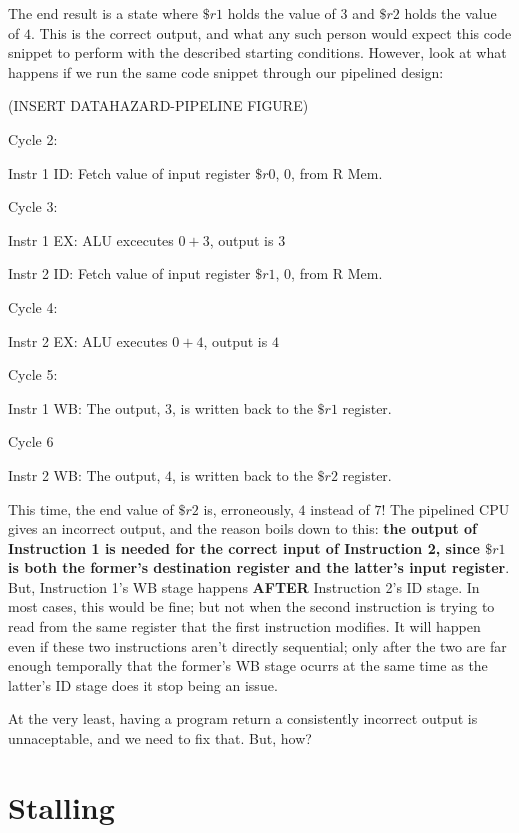 \documentclass[12pt,twoside]{reedthesis}
\begin{document}
\vspace{5mm}

The end result is a state where $\$r1$ holds the value of $3$ and $\$r2$ holds the value of $4$. This is the correct output, and what any such person would expect this code snippet to perform with the described starting conditions. However, look at what happens if we run the same code snippet through our pipelined design:

(INSERT DATAHAZARD-PIPELINE FIGURE)

Cycle 2:

\qquad Instr 1 ID:  Fetch value of input register $\$r0$, $0$, from R Mem.

Cycle 3:

\qquad Instr 1 EX: ALU excecutes $0 + 3$, output is $3$

\qquad Instr 2 ID: Fetch value of input register $\$r1$, $0$, from R Mem.

Cycle 4:

\qquad Instr 2 EX: ALU executes $0 + 4$, output is $4$

Cycle 5:

\qquad Instr 1 WB: The output, $3$, is written back to the $\$r1$ register.

Cycle 6

\qquad Instr 2 WB: The output, $4$, is written back to the $\$r2$ register.

\vspace{5mm}

This time, the end value of $\$r2$ is, erroneously, $4$ instead of $7$! The pipelined CPU gives an incorrect output, and the reason boils down to this: \textbf{the output of Instruction 1 is needed for the correct input of Instruction 2, since $\$r1$ is both the former's destination register and the latter's input register}. But, Instruction 1's WB stage happens \textbf{AFTER} Instruction 2's ID stage. In most cases, this would be fine; but not when the second instruction is trying to read from the same register that the first instruction modifies. It will happen even if these two instructions aren't directly sequential; only after the two are far enough temporally that the former's WB stage ocurrs at the same time as the latter's ID stage does it stop being an issue.

At the very least, having a program return a consistently incorrect output is unnaceptable, and we need to fix that. But, how?

\section{Stalling}
\end{document}
